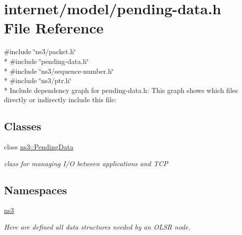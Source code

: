 \hypertarget{pending-data_8h}{}\section{internet/model/pending-\/data.h File Reference}
\label{pending-data_8h}
{\ttfamily \#include \char`\"{}ns3/packet.\+h\char`\"{}}\\*
{\ttfamily \#include \char`\"{}pending-\/data.\+h\char`\"{}}\\*
{\ttfamily \#include \char`\"{}ns3/sequence-\/number.\+h\char`\"{}}\\*
{\ttfamily \#include \char`\"{}ns3/ptr.\+h\char`\"{}}\\*
Include dependency graph for pending-\/data.h\+:
This graph shows which files directly or indirectly include this file\+:
\subsection*{Classes}
\begin{DoxyCompactItemize}
\item 
class \hyperlink{classns3_1_1PendingData}{ns3\+::\+Pending\+Data}
\begin{DoxyCompactList}\small\item\em class for managing I/O between applications and T\+CP \end{DoxyCompactList}\end{DoxyCompactItemize}
\subsection*{Namespaces}
\begin{DoxyCompactItemize}
\item 
 \hyperlink{namespacens3}{ns3}
\begin{DoxyCompactList}\small\item\em Here are defined all data structures needed by an O\+L\+SR node. \end{DoxyCompactList}\end{DoxyCompactItemize}
